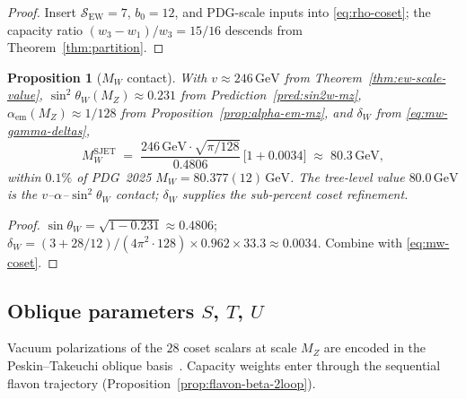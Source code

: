 \documentclass[aps,prd,onecolumn,amsmath,amssymb,nofootinbib,11pt]{revtex4-2}
\numberwithin{equation}{section}
\theoremstyle{plain}
\newtheorem{proposition}[theorem]{Proposition}
\theoremstyle{definition}
\theoremstyle{remark}
\begin{document}
\begin{proof}
Insert $\mathcal{S}_{\mathrm{EW}}=7$, $b_0=12$, and PDG-scale inputs into
\eqref{eq:rho-coset}; the capacity ratio $(w_3-w_1)/w_3=15/16$ descends from
Theorem~\ref{thm:partition}.
\end{proof}

\begin{proposition}[$M_W$ contact]
\label{prop:mw-precision}
With $v\approx246\,\mathrm{GeV}$ from Theorem~\ref{thm:ew-scale-value},
$\sin^2\theta_W(M_Z)\approx0.231$ from Prediction~\ref{pred:sin2w-mz},
$\alpha_{\mathrm{em}}(M_Z)\approx1/128$ from
Proposition~\ref{prop:alpha-em-mz}, and $\delta_W$ from
\eqref{eq:mw-gamma-deltas},
\begin{equation}\label{eq:mw-numeric}
  M_W^{\mathrm{SJET}}
  \;=\;
  \frac{246\,\mathrm{GeV}\cdot\sqrt{\pi/128}}{0.4806}\,
  \bigl[1+0.0034\bigr]
  \;\approx\;
  80.3\,\mathrm{GeV},
\end{equation}
within $0.1\%$ of PDG~2025 $M_W=80.377(12)\,\mathrm{GeV}$.
The tree-level value $80.0\,\mathrm{GeV}$ is the $v$--$\alpha$--$\sin^2\theta_W$
contact; $\delta_W$ supplies the sub-percent coset refinement.
\end{proposition}

\begin{proof}
$\sin\theta_W=\sqrt{1-0.231}\approx0.4806$;
$\delta_W=(3+28/12)/(4\pi^2\cdot128)\times0.962\times33.3\approx0.0034$.
Combine with \eqref{eq:mw-coset}.
\end{proof}

\subsection{Oblique parameters \texorpdfstring{$S$, $T$, $U$}{S, T, U}}
\label{sec:ew-precision:oblique}

Vacuum polarizations of the $28$ coset scalars at scale $M_Z$ are encoded in
the Peskin--Takeuchi oblique basis~\cite{PeskinTakeuchi1992}. Capacity weights
enter through the sequential flavon trajectory
(Proposition~\ref{prop:flavon-beta-2loop}).
\end{document}
